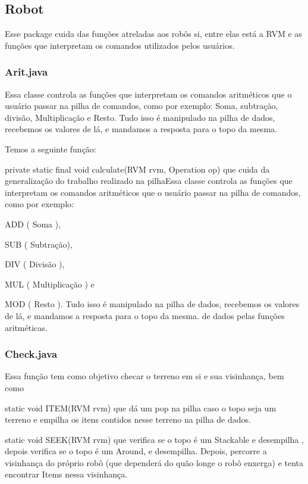 \documentclass[a4paper]{article}
\begin{document}
{{{{{{{{{{{{{{{{{{\newpage %

	\subsection{Robot}
	    Esse package cuida das funções atreladas aos robôs
	    si, entre elas está a RVM e as funções que interpretam
	    os comandos utilizados pelos usuários.
	    
		\subsubsection{ Arit.java }
		    Essa classe controla as funções que interpretam
		    os comandos aritméticos que o usuário passar na
		    pilha de comandos, como por exemplo: Soma,
		    subtração, divisão, Multiplicação e Resto.
		    Tudo isso é manipulado na pilha de dados,
		    recebemos os valores de lá, e mandamos a resposta
		    para o topo da mesma.
		    
		    Temos a seguinte função:
		    
		    {\textcolor{NavyBlue}{ private static final void 
		    calculate(RVM rvm, Operation op) }
		    que cuida da generalização do trabalho realizado 
		    na pilhaEssa classe controla as funções que interpretam
		    os comandos aritméticos que o usuário passar na
		    pilha de comandos, como por exemplo: 
		    {\textcolor{NavyBlue}{ADD} ( Soma ),
		    {\textcolor{NavyBlue}{SUB} ( Subtração),
		    {\textcolor{NavyBlue}{DIV} ( Divisão ), 
		    {\textcolor{NavyBlue}{MUL} ( Multiplicação ) e 
		    {\textcolor{NavyBlue}{MOD} ( Resto ).
		    Tudo isso é manipulado na pilha de dados,
		    recebemos os valores de lá, e mandamos a resposta
		    para o topo da mesma. de dados pelas funções aritméticas.
		        
		\subsubsection{ Check.java }
		    Essa função tem como objetivo checar o terreno em
		    si e sua visinhança, bem como 
		    
		    {\textcolor{NavyBlue}{  static void ITEM(RVM rvm) }
		    que dá um pop na pilha caso o topo seja um terreno
		    e empilha os itens contidos nesse terreno na pilha
		    de dados.
		    
		    {\textcolor{NavyBlue}{  static void SEEK(RVM rvm) }
		    que verifica se o topo é um Stackable e desempilha
		    , depois verifica se o topo é um Around, e desempilha.
		    Depois, percorre a visinhança do próprio robô 
		    (que dependerá do quão longe o robô enxerga)
		    e tenta encontrar Items nessa visinhança.
		    
}}}}}}}}}}}}}}}}}}}}}}}}}}
\end{document}
